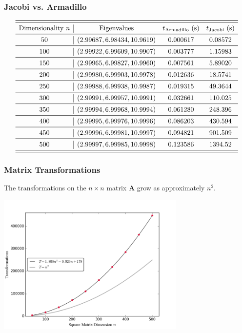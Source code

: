\documentclass[10pt,xcolor={x11names}]{beamer}
\begin{document}
		\begin{frame} \frametitle{Jacobi vs. Armadillo}
			\[
   		 	\begin{array}{c|ccc}
    		\toprule \midrule
    		\text{Dimensionality $n$} & \text{Eigenvalues} & t_\text{Armadillo} \text{ (s)} & t_\text{Jacobi} \text{ (s)} \\ \midrule
     		50   &  (2.99687, 6.98434, 10.9619)  &   0.000617    &    0.08572   \\ \midrule
    		100   &  (2.99922, 6.99609, 10.9907)  &    0.003777  &        1.15983   \\ \midrule
    		150  &   (2.99965, 6.99827, 10.9960)  &    0.007561    &      5.89020    \\ \midrule
     		200   &  (2.99980, 6.99903, 10.9978) &      0.012636       &  18.5741  \\ \midrule
    		250  &   (2.99988, 6.99938, 10.9987)   &    0.019315       &   49.3644   \\ \midrule
    		300  &   (2.99991, 6.99957, 10.9991)    &   0.032661  &        110.025   \\ \midrule
    		350  &   (2.99994, 6.99968, 10.9994)    &   0.061280     &     248.396     \\ \midrule
    		400  &   (2.99995, 6.99976, 10.9996)    &   0.086203     &     430.594    \\ \midrule
    		450  &   (2.99996, 6.99981, 10.9997)    &   0.094821  &        901.509    \\ \midrule
    		500  &   (2.99997, 6.99985, 10.9998)   &     0.123586   &       1394.52     \\ \midrule
    		\bottomrule
    		\end{array}
    		\]
		\end{frame}

		\begin{frame} \frametitle{Matrix Transformations}
			The transformations on the $n\times n$ matrix \textbf{A} grow as approximately $n^2$. 
			\begin{center}\includegraphics[width=0.7\textwidth]{Code/TvsN.png}\end{center}
		\end{frame}
\end{document}
